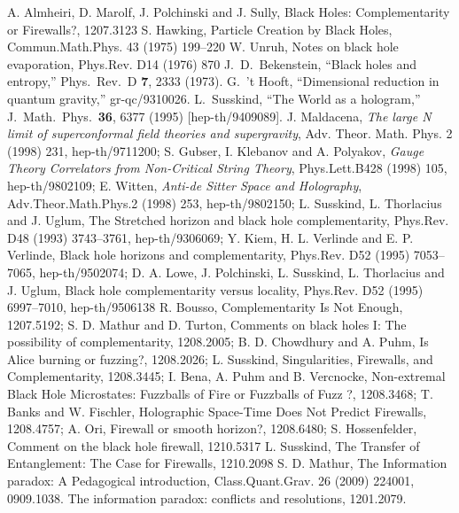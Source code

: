 \documentclass[12pt]{article}%
\begin{document}
\begin{thebibliography}{99}

A. Almheiri, D. Marolf, J. Polchinski and J. Sully, Black Holes: Complementarity or Firewalls?, 1207.3123 
 S. Hawking, Particle Creation by Black Holes, Commun.Math.Phys. 43 (1975) 199--220
 W. Unruh, Notes on black hole evaporation, Phys.Rev. D14 (1976) 870
    J.~D.~Bekenstein, ``Black holes and entropy,'' Phys.\ Rev.\ D {\bf 7}, 2333 (1973).
  G.~'t Hooft,  ``Dimensional reduction in quantum gravity,'' gr-qc/9310026.
   L.~Susskind,  ``The World as a hologram,'' J.\ Math.\ Phys.\  {\bf 36}, 6377 (1995) [hep-th/9409089].
 J. Maldacena,  {\it  The large N limit of superconformal field theories and supergravity}, Adv. Theor. Math. Phys. 2 (1998) 231,
hep-th/9711200; S. Gubser, I. Klebanov and A. Polyakov,  {\it Gauge Theory Correlators from Non-Critical String Theory},
 Phys.Lett.B428 (1998) 105, 
hep-th/9802109; E. Witten, {\it Anti-de Sitter Space and Holography},
Adv.Theor.Math.Phys.2 (1998) 253, hep-th/9802150;
  L. Susskind, L. Thorlacius and J. Uglum, The Stretched horizon and black hole complementarity, Phys.Rev. D48 (1993) 3743--3761, hep-th/9306069;
 Y. Kiem, H. L. Verlinde and E. P. Verlinde, Black hole horizons and complementarity, Phys.Rev. D52 (1995) 7053--7065, hep-th/9502074;
D. A. Lowe, J. Polchinski, L. Susskind, L. Thorlacius and J. Uglum, Black hole complementarity versus locality, Phys.Rev. D52 (1995) 6997--7010, hep-th/9506138 
R. Bousso, Complementarity Is Not Enough, 1207.5192;
S. D. Mathur and D. Turton, Comments on black holes I: The possibility of complementarity, 1208.2005;
B. D. Chowdhury and A. Puhm, Is Alice burning or fuzzing?, 1208.2026;  L. Susskind, Singularities, Firewalls, and Complementarity, 1208.3445;
 I. Bena, A. Puhm and B. Vercnocke, Non-extremal Black Hole Microstates: Fuzzballs of Fire or Fuzzballs of Fuzz ?, 1208.3468;
 T. Banks and W. Fischler, Holographic Space-Time Does Not Predict Firewalls, 1208.4757;
 A. Ori, Firewall or smooth horizon?, 1208.6480;   S. Hossenfelder, Comment on the black hole firewall, 1210.5317
 L. Susskind, The Transfer of Entanglement: The Case for Firewalls, 1210.2098
   S. D. Mathur, The Information paradox: A Pedagogical introduction, Class.Quant.Grav. 26 (2009) 224001, 0909.1038.
The information paradox: conflicts and resolutions, 1201.2079.

\end{thebibliography}
\end{document}
